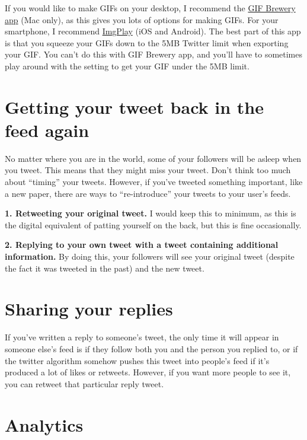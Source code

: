 \documentclass[]{book}
\begin{document}
If you would like to make GIFs on your desktop, I recommend the \href{https://gfycat.com/gifbrewery}{GIF Brewery app} (Mac only), as this gives you lots of options for making GIFs. For your smartphone, I recommend \href{https://imgplay.net/}{ImgPlay} (iOS and Android). The best part of this app is that you squeeze your GIFs down to the 5MB Twitter limit when exporting your GIF. You can't do this with GIF Brewery app, and you'll have to sometimes play around with the setting to get your GIF under the 5MB limit.

\hypertarget{getting-your-tweet-back-in-the-feed-again}{%
\section{Getting your tweet back in the feed again}\label{getting-your-tweet-back-in-the-feed-again}}

No matter where you are in the world, some of your followers will be asleep when you tweet. This means that they might miss your tweet. Don't think too much about ``timing'' your tweets. However, if you've tweeted something important, like a new paper, there are ways to ``re-introduce'' your tweets to your user's feeds.

\textbf{1. Retweeting your original tweet.} I would keep this to minimum, as this is the digital equivalent of patting yourself on the back, but this is fine occasionally.

\textbf{2. Replying to your own tweet with a tweet containing additional information.} By doing this, your followers will see your original tweet (despite the fact it was tweeted in the past) and the new tweet.

\hypertarget{sharing-your-replies}{%
\section{Sharing your replies}\label{sharing-your-replies}}

If you've written a reply to someone's tweet, the only time it will appear in someone else's feed is if they follow both you and the person you replied to, or if the twitter algorithm somehow pushes this tweet into people's feed if it's produced a lot of likes or retweets. However, if you want more people to see it, you can retweet that particular reply tweet.

\hypertarget{analytics}{%
\section{Analytics}\label{analytics}}
\end{document}

